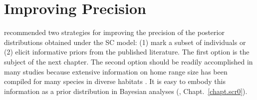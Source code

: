 




\section{Improving Precision}
\label{unmarked.sec.precision}



\citet{chandler_royle:2012} recommended two strategies for improving
the precision of the posterior distributions obtained under the SC
model: (1) mark a subset of individuals or (2) elicit informative
priors from the published literature.
The first option is the subject of the next chapter. The second option
should be readily accomplished in many studies %
because extensive information on home range size has
been compiled for many species in diverse habitats %
\citep[\emph{e.g.},][]{degraaf_yamasaki:2001}. It is
easy to embody this information as a prior distribution in Bayesian
analyses (\citet{chandler_royle:2012}, Chapt.~\ref{chapt.scr0}).

